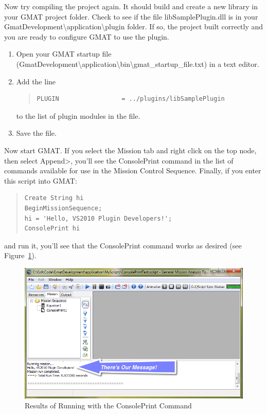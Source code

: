 \documentclass[10pt,letterpaper]{article}
\begin{document}
Now try compiling the project again.  It should build and create a new library in your GMAT project folder.  Check to see if the file libSamplePlugin.dll is in your GmatDevelopment{\textbackslash}application{\textbackslash}plugin folder.  If so, the project built correctly and you are ready to configure GMAT to use the plugin.

\begin{enumerate}
\item Open your GMAT startup file (GmatDevelopment{\textbackslash}application{\textbackslash}bin{\textbackslash}gmat{\_}startup{\_}file.txt) in a text editor.
\item Add the line
\begin{quote}
\begin{verbatim}
PLUGIN                 = ../plugins/libSamplePlugin
\end{verbatim}
\end{quote}
\noindent to the list of plugin modules in the file.
\item Save the file.
\end{enumerate}

Now start GMAT.  If you select the Mission tab and right click on the top node, then select Append\textgreater, you'll see the ConsolePrint command in the list of commands available for use in the Mission Control Sequence.   Finally, if you enter this script into GMAT:
 
\begin{quote}
\begin{verbatim}
Create String hi
BeginMissionSequence;
hi = 'Hello, VS2010 Plugin Developers!';
ConsolePrint hi
\end{verbatim}
\end{quote}

\noindent and run it, you'll see that the ConsolePrint command works as desired (see Figure~\ref{Results}).

\begin{figure}[htb]
\begin{center}
\includegraphics[scale=0.54]{images/FinalOutput.png}
\caption{\label{Results}Results of Running with the ConsolePrint Command}
\end{center}
\end{figure}
 
\end{document}
